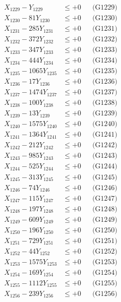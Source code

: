 \documentclass[a4paper,10pt]{article}
\begin{document}
{\begin{align}
X_{1229} - Y_{1229} &\leq +0 && \text{(G1229)} \\
X_{1230} - 81Y_{1230} &\leq +0 && \text{(G1230)} \\
\allowbreak
X_{1231} - 285Y_{1231} &\leq +0 && \text{(G1231)} \\
X_{1232} - 372Y_{1232} &\leq +0 && \text{(G1232)} \\
X_{1233} - 347Y_{1233} &\leq +0 && \text{(G1233)} \\
X_{1234} - 444Y_{1234} &\leq +0 && \text{(G1234)} \\
X_{1235} - 1065Y_{1235} &\leq +0 && \text{(G1235)} \\
X_{1236} - 17Y_{1236} &\leq +0 && \text{(G1236)} \\
X_{1237} - 1474Y_{1237} &\leq +0 && \text{(G1237)} \\
X_{1238} - 100Y_{1238} &\leq +0 && \text{(G1238)} \\
X_{1239} - 13Y_{1239} &\leq +0 && \text{(G1239)} \\
X_{1240} - 1575Y_{1240} &\leq +0 && \text{(G1240)} \\
\allowbreak
X_{1241} - 1364Y_{1241} &\leq +0 && \text{(G1241)} \\
X_{1242} - 212Y_{1242} &\leq +0 && \text{(G1242)} \\
X_{1243} - 985Y_{1243} &\leq +0 && \text{(G1243)} \\
X_{1244} - 525Y_{1244} &\leq +0 && \text{(G1244)} \\
X_{1245} - 313Y_{1245} &\leq +0 && \text{(G1245)} \\
X_{1246} - 74Y_{1246} &\leq +0 && \text{(G1246)} \\
X_{1247} - 115Y_{1247} &\leq +0 && \text{(G1247)} \\
X_{1248} - 197Y_{1248} &\leq +0 && \text{(G1248)} \\
X_{1249} - 609Y_{1249} &\leq +0 && \text{(G1249)} \\
X_{1250} - 196Y_{1250} &\leq +0 && \text{(G1250)} \\
\allowbreak
X_{1251} - 729Y_{1251} &\leq +0 && \text{(G1251)} \\
X_{1252} - 44Y_{1252} &\leq +0 && \text{(G1252)} \\
X_{1253} - 1575Y_{1253} &\leq +0 && \text{(G1253)} \\
X_{1254} - 169Y_{1254} &\leq +0 && \text{(G1254)} \\
X_{1255} - 1112Y_{1255} &\leq +0 && \text{(G1255)} \\
X_{1256} - 239Y_{1256} &\leq +0 && \text{(G1256)} \\

\end{align}}
\end{document}
